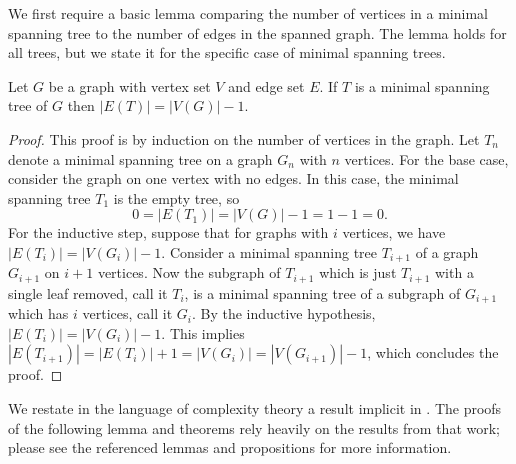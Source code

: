 \documentclass{article}
\begin{document}
We first require a basic lemma comparing the number of vertices in a minimal spanning tree to the number of edges in the spanned graph.
The lemma holds for all trees, but we state it for the specific case of minimal spanning trees.
\begin{lemma}\label{lem:tree}
  Let $G$ be a graph with vertex set $V$ and edge set $E$.
  If $T$ is a minimal spanning tree of $G$ then $|E(T)| = |V(G)| - 1$.
\end{lemma}
\begin{proof}
  This proof is by induction on the number of vertices in the graph.
  Let $T_n$ denote a minimal spanning tree on a graph $G_n$ with $n$ vertices.
  For the base case, consider the graph on one vertex with no edges.
  In this case, the minimal spanning tree $T_1$ is the empty tree, so
  \begin{equation*}
    0 = |E(T_1)| = |V(G)| - 1 = 1 - 1 = 0.
  \end{equation*}
  For the inductive step, suppose that for graphs with $i$ vertices, we have $|E(T_i)| = |V(G_i)| - 1$.
  Consider a minimal spanning tree $T_{i + 1}$ of a graph $G_{i + 1}$ on $i + 1$ vertices.
  Now the subgraph of $T_{i + 1}$ which is just $T_{i + 1}$ with a single leaf removed, call it $T_i$, is a minimal spanning tree of a subgraph of $G_{i + 1}$ which has $i$ vertices, call it $G_i$.
  By the inductive hypothesis, $|E(T_i)| = |V(G_i)| - 1$.
  This implies $|E(T_{i + 1})| = |E(T_i)| + 1 = |V(G_i)| = |V(G_{i + 1})| - 1$, which concludes the proof.
\end{proof}

We restate in the language of complexity theory a result implicit in \cite{km02}.
The proofs of the following lemma and theorems rely heavily on the results from that work; please see the referenced lemmas and propositions for more information.
\end{document}
